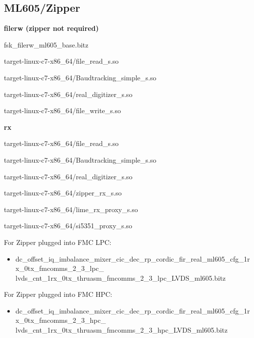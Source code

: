 \subsection{ML605/Zipper}
	\noindent\textbf{filerw (zipper not required)}
	\begin{itemize}
	\begin{minipage}[t]{.5\textwidth}
	\item fsk\_filerw\_ml605\_base.bitz
	\item target-linux-c7-x86\_64/file\_read\_s.so
	\item target-linux-c7-x86\_64/Baudtracking\_simple\_s.so
	\end{minipage}
	\begin{minipage}[t]{.5\textwidth}
	\item target-linux-c7-x86\_64/real\_digitizer\_s.so
	\item target-linux-c7-x86\_64/file\_write\_s.so
	\end{minipage}
	\end{itemize}
	
	\noindent\textbf{rx}
	\begin{itemize}
	\begin{minipage}[t]{.5\textwidth}
	\item target-linux-c7-x86\_64/file\_read\_s.so
	\item target-linux-c7-x86\_64/Baudtracking\_simple\_s.so
	\item target-linux-c7-x86\_64/real\_digitizer\_s.so
	\end{minipage}
	\begin{minipage}[t]{.5\textwidth}
	\item target-linux-c7-x86\_64/zipper\_rx\_s.so
	\item target-linux-c7-x86\_64/lime\_rx\_proxy\_s.so
	\item target-linux-c7-x86\_64/si5351\_proxy\_s.so
	\end{minipage}
	\end{itemize}
	For Zipper plugged into FMC LPC:
	\begin{itemize}
	\item dc\_offset\_iq\_imbalance\_mixer\_cic\_dec\_rp\_cordic\_fir\_real\_ml605\_cfg\_1rx\_0tx\_fmcomms\_2\_3\_lpc\_ \\
	lvds\_cnt\_1rx\_0tx\_thruasm\_fmcomms\_2\_3\_lpc\_LVDS\_ml605.bitz
	\end{itemize}
	\noindent For Zipper plugged into FMC HPC:
	\begin{itemize}
	\item dc\_offset\_iq\_imbalance\_mixer\_cic\_dec\_rp\_cordic\_fir\_real\_ml605\_cfg\_1rx\_0tx\_fmcomms\_2\_3\_hpc\_ \\
	lvds\_cnt\_1rx\_0tx\_thruasm\_fmcomms\_2\_3\_hpc\_LVDS\_ml605.bitz
	\end{itemize}
	
